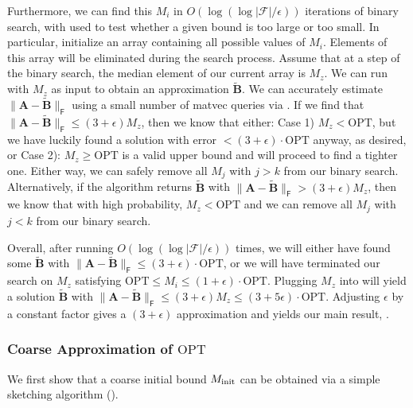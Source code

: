 \documentclass{article}[11pt]
\theoremstyle{definition}
\newcommand{\bv}[1]{\boldsymbol{\mathbf{#1}}}
\newcommand{\Fro}{\mathsf{F}}
\newcommand{\F}{\mathcal{F}}
\newcommand{\OPT}{\mathrm{OPT}}
\begin{document}
Furthermore, we can find this $M_i$ in $O(\log(\log|\F|/\epsilon))$ iterations of binary search, with  used to test whether a given bound is too large or too small. In particular, initialize an array containing all possible values of $M_i$. Elements of this array will be eliminated during the search process. Assume that at a step of the binary search, the median element of our current array is $M_z$. We can run  with $M_z$ as input to obtain an approximation $\bv{\tilde B}$. We can accurately estimate $\|\bv{A}-\bv{\tilde B}\|_\Fro$ using a small number of matvec queries via . If we find that $\|\bv{A} - \bv{\tilde B}\|_\Fro \le (3+\epsilon) M_z$, then we know that either: Case 1) $M_z < \OPT$, but we have luckily found a solution with error $< (3+\epsilon) \cdot \OPT$ anyway, as desired, or Case 2): $M_z \ge \OPT$ is a valid upper bound and will proceed to find a tighter one.
Either way, we can safely remove all $M_j$ with $j > k$ from our binary search. Alternatively, if the algorithm returns $\bv{\tilde B}$ with $\|\bv{A} - \bv{\tilde B}\|_\Fro > (3+\epsilon) M_z$, then we know that with high probability, $M_z < \OPT$ and we can remove all $M_j$ with $j < k$ from our binary search. 

Overall, after running  $O(\log(\log|\F|/\epsilon))$ times, we will either have found some $\bv {\tilde B}$ with $\|\bv{A} - \bv{\tilde B}\|_\Fro \le (3+\epsilon) \cdot \OPT$, or we will have terminated our search on $M_z$ satisfying $\OPT \le M_i \le (1+\epsilon) \cdot \OPT$. Plugging $M_z$ into  will yield a solution $\bv{\tilde B}$ with $\|\bv{A} - \bv{\tilde B}\|_\Fro \le (3+\epsilon) M_z \le (3+5\epsilon) \cdot \OPT$. Adjusting $\epsilon$ by a constant factor gives a $(3+\epsilon)$ approximation and yields our main result, .


\subsubsection{Coarse Approximation of \texorpdfstring{$\OPT$}{OPT}}
We first show that a coarse initial bound $M_{\rm init}$ can be obtained via a simple sketching algorithm ().
\end{document}
